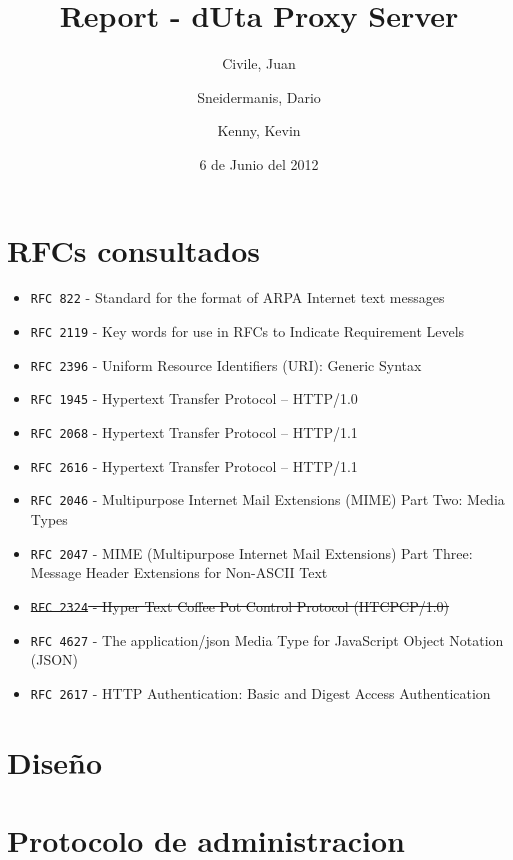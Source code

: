 \documentclass[11pt,a4paper,titlepage]{article}
\title{Report - dUta Proxy Server}
\author{Civile, Juan \and Sneidermanis, Dario \and Kenny, Kevin}
\date{6 de Junio del 2012}
\begin{document}
\newcommand{\awesome}[1]{\texttt{\large #1}}
\newcommand{\ua}{\textit{User Agent} }
\newcommand{\os}{\textit{Origin Server} }
\newcommand{\duta}{\awesome{dUta}}

\maketitle
\tableofcontents
\clearpage

\section{RFCs consultados}

\begin{itemize}

    \item \awesome{RFC 822}  - Standard for the format of ARPA Internet text messages
    \item \awesome{RFC 2119} - Key words for use in RFCs to Indicate Requirement Levels
    \item \awesome{RFC 2396} - Uniform Resource Identifiers (URI): Generic Syntax
    \item \awesome{RFC 1945} - Hypertext Transfer Protocol -- HTTP/1.0
    \item \awesome{RFC 2068} - Hypertext Transfer Protocol -- HTTP/1.1
    \item \awesome{RFC 2616} - Hypertext Transfer Protocol -- HTTP/1.1
    \item \awesome{RFC 2046} - Multipurpose Internet Mail Extensions (MIME) Part Two: Media Types
    \item \awesome{RFC 2047} - MIME (Multipurpose Internet Mail Extensions) Part Three: Message Header Extensions for Non-ASCII Text
    \item \sout{\awesome{RFC 2324} - Hyper Text Coffee Pot Control Protocol (HTCPCP/1.0)}
    \item \awesome{RFC 4627} - The application/json Media Type for JavaScript Object Notation (JSON)
    \item \awesome{RFC 2617} - HTTP Authentication: Basic and Digest Access Authentication
\end{itemize}


\section{Diseño}

\section{Protocolo de administracion}
\end{document}
